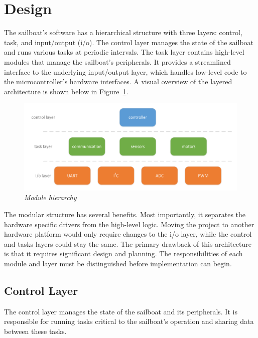\documentclass[12pt]{article}
\begin{document}
\clearpage

\section{Design}
The sailboat's software has a hierarchical structure with three layers: control, task, and input/output (i/o). The control layer manages the state of the sailboat and runs various tasks at periodic intervals. The task layer contains high-level modules that manage the sailboat's peripherals. It provides a streamlined interface to the underlying input/output layer, which handles low-level code to the microcontroller's hardware interfaces. A visual overview of the layered architecture is shown below in Figure~\ref{fig:module_hierarchy}.  

\begin{figure}[h]
	\centering
	\includegraphics[width=\textwidth]{figures/module_hierarchy.pdf}
	\caption[Module hierarchy]{\textsl{Module hierarchy}}
	\label{fig:module_hierarchy}
\end{figure}

The modular structure has several benefits. Most importantly, it separates the hardware specific drivers from the high-level logic. Moving the project to another hardware platform would only require changes to the i/o layer, while the control and tasks layers could stay the same. The primary drawback of this architecture is that it requires significant design and planning. The responsibilities of each module and layer must be distinguished before implementation can begin.

\subsection{Control Layer}
\label{subsec:ctrl}
The control layer manages the state of the sailboat and its peripherals. It is responsible for running tasks critical to the sailboat's operation and sharing data between these tasks.
\end{document}
